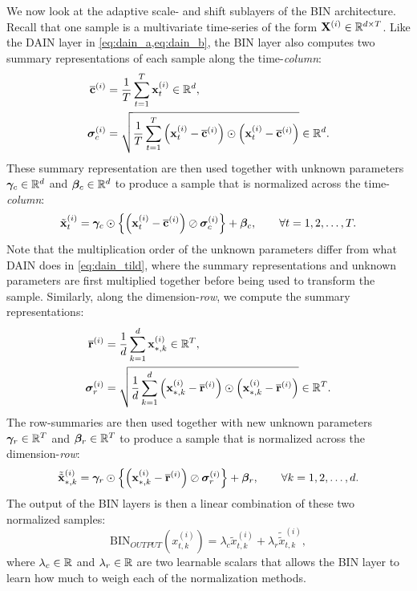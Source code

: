 \documentclass{statsmsc}
\begin{document}
{We now look at the adaptive scale- and shift sublayers of the \ac{BIN} architecture.
Recall that one sample is a multivariate time-series of the form $\mathbf{X}^{(i)} \in \mathbb{R}^{d \times T}$.
Like the \ac{DAIN} layer in \cref{eq:dain_a,eq:dain_b}, the \ac{BIN} layer also
computes two summary representations of each sample along the time-\textit{column}:
\begin{align}
    \overline{\mathbf{c}}^{(i)}& =\frac{1}{T} \sum^{T}_{t=1} \mathbf{x}_t^{(i)} \in \mathbb{R}^d, \\
    \bm\sigma_c^{(i)}&=\sqrt{
    \frac{1}{T} \sum^{T}_{t=1} \left(\mathbf{x}^{(i)}_{t} - \overline{\mathbf{c}}^{(i)} \right)
    \odot \left(\mathbf{x}^{(i)}_{t} - \overline{\mathbf{c}}^{(i)} \right)
} \in \mathbb{R}^d.
\end{align}
These summary representation are then used together with unknown parameters
$\bm\gamma_c \in \mathbb{R}^d$ and $\bm\beta_c \in \mathbb{R}^d$ to produce a sample that is normalized across
the time-\textit{column}:
\begin{equation}
    \tilde{\mathbf{x}}^{(i)}_t= \bm\gamma_c \odot \left\{
        \left(\mathbf{x}^{(i)}_t - \overline{\mathbf{c}}^{(i)}\right)\oslash \bm\sigma_c^{(i)}
    \right\}+\bm\beta_c, \qquad \forall t=1,2,\dots,T.
\end{equation}
Note that the multiplication order of the unknown parameters differ from what
\ac{DAIN} does in \cref{eq:dain_tild}, where the summary representations and unknown parameters
are first multiplied together before being used to transform the sample.
Similarly, along the dimension-\textit{row}, we compute
the summary representations:
\begin{align}
    \overline{\mathbf{r}}^{(i)}& =\frac{1}{d} \sum^{d}_{k=1} \mathbf{x}_{*,k}^{(i)} \in \mathbb{R}^T, \\
    \bm\sigma_r^{(i)}&=\sqrt{
        \frac{1}{d} \sum^{d}_{k=1} \left(\mathbf{x}^{(i)}_{*,k} - \overline{\mathbf{r}}^{(i)} \right)
        \odot \left(\mathbf{x}^{(i)}_{*,k} - \overline{\mathbf{r}}^{(i)} \right)
    } \in \mathbb{R}^T.
\end{align}
The row-summaries are then used together with new unknown parameters
$\bm\gamma_r \in \mathbb{R}^T$ and $\bm\beta_r \in \mathbb{R}^T$ to produce
a sample that is normalized across the dimension-\textit{row}:
\begin{equation}
    \tilde{\tilde{\mathbf{x}}}^{(i)}_{*,k}= \bm\gamma_r \odot \left\{
        \left(\mathbf{x}^{(i)}_{*,k} - \overline{\mathbf{r}}^{(i)}\right)\oslash \bm\sigma_r^{(i)}
    \right\}+\bm\beta_r, \qquad \forall k=1,2,\dots,d.
\end{equation}
The output of the \ac{BIN} layers is then a linear combination of these two normalized samples:
\begin{equation}
    \textrm{BIN}_{OUTPUT}\left( x_{t,k}^{(i)}\right)
    = \lambda_c \tilde{x}^{(i)}_{t,k} + \lambda_r \tilde{\tilde{x}}^{(i)}_{t,k},
\end{equation}
where $\lambda_c \in \mathbb{R}$ and $\lambda_r\in\mathbb{R}$ are two learnable scalars that allows the \ac{BIN} layer
to learn how much to weigh each of the normalization methods.


}
\end{document}
